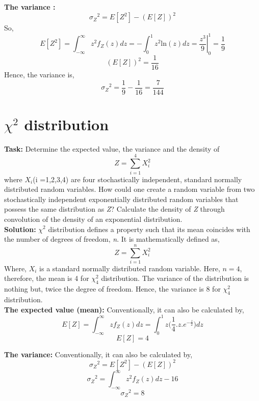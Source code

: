 \noindent \textbf{The variance :}
$${\sigma_Z}^{2} = E[Z ^2] - (E[Z])^2 $$
\noindent So, 
$$ E[Z ^2] =  \int_{-\infty}^{\infty}z^2 f_Z(z) dz =  -\int_0^1z^2 \text{ln}(z) dz = \left.\frac{z^3}{9}\right|_0^1 = \frac{1}{9} $$
$$(E[Z])^2 = \frac{1}{16}$$
\noindent Hence, the variance is,
$${\sigma_Z}^{2} = \frac{1}{9} - \frac{1}{16}= \frac{7}{144}$$

\section{$\chi^2$ distribution}
\noindent \textbf{Task:} Determine the expected value, the variance and the density of \\
$$Z = \sum\limits_{i=1}^{4} X_i^2$$
where $X_i$(i =1,2,3,4) are four stochastically independent, standard normally distributed random variables. How could one create a random variable from two stochastically independent exponentially distributed random variables that possess the same distribution as \textit{Z}? Calculate the density of \textit{Z} through convolution of the density of an exponential distribution.\\

\noindent \textbf{Solution:} 
\noindent $\chi^2$ distribution defines a property such that its mean coincides with the number of degrees of freedom, \textit{n}. It is mathematically defined as,
$$ Z = \sum_{i=1}^{n} X_i^{2}    $$ 
\noindent Where, $X_i$ is a standard normally distributed random variable. Here, $n = 4$, therefore, the mean is 4 for  $\chi_4^{2} $ distribution. 
\noindent The variance of the distribution is nothing but, twice the degree of freedom. Hence, the variance is 8 for $\chi_4^{2} $ distribution.\\
\noindent \textbf{The expected value (mean):}
\noindent Conventionally, it can also be calculated by,
$$E[Z] = \int_{-\infty}^{\infty} z f_Z(z) dz = \int_0^1 z\Bigg(\frac{1}{4}.z.e^{-\frac{z}{2}}\Bigg)dz $$
  $$E[Z] = 4 $$


\noindent \textbf{The variance:}
\noindent Conventionally, it can also be calculated by,
$${\sigma_Z}^{2} = E[Z ^2] - (E[Z])^2 $$
$${\sigma_Z}^{2} = \int_{-\infty}^{\infty} z^2 f_Z(z)dz -16 $$
$${\sigma_Z}^{2} = 8 $$

